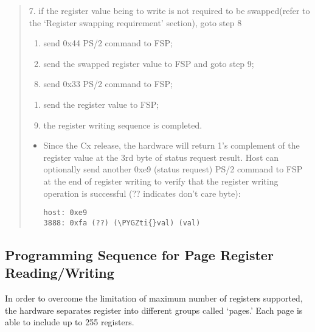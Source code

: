 \documentclass[a4paper,8pt,english]{sphinxmanual}
\def\PYGZti{\char`\~}
\begin{document}
\begin{quote}
\begin{enumerate}
\end{enumerate}

7. if the register value being to write is not required to be
swapped(refer to the `Register swapping requirement' section),
goto step 8
\begin{enumerate}
\item {} 
send 0x44 PS/2 command to FSP;

\item {} 
send the swapped register value to FSP and goto step 9;

\end{enumerate}
\begin{enumerate}
\setcounter{enumi}{7}
\item {} 
send 0x33 PS/2 command to FSP;

\end{enumerate}
\begin{enumerate}
\item {} 
send the register value to FSP;

\end{enumerate}
\begin{enumerate}
\setcounter{enumi}{8}
\item {} 
the register writing sequence is completed.

\end{enumerate}
\begin{itemize}
\item {} 
Since the Cx release, the hardware will return 1's
complement of the register value at the 3rd byte of status request
result. Host can optionally send another 0xe9 (status request) PS/2
command to FSP at the end of register writing to verify that the
register writing operation is successful (?? indicates don't care
byte):

\begin{Verbatim}[commandchars=\\\{\}]
host: 0xe9
3888: 0xfa (??) (\PYGZti{}val) (val)
\end{Verbatim}

\end{itemize}
\end{quote}


\subsection{Programming Sequence for Page Register Reading/Writing}
\label{input/devices/sentelic:programming-sequence-for-page-register-reading-writing}
In order to overcome the limitation of maximum number of registers
supported, the hardware separates register into different groups called
`pages.' Each page is able to include up to 255 registers.
\end{document}
